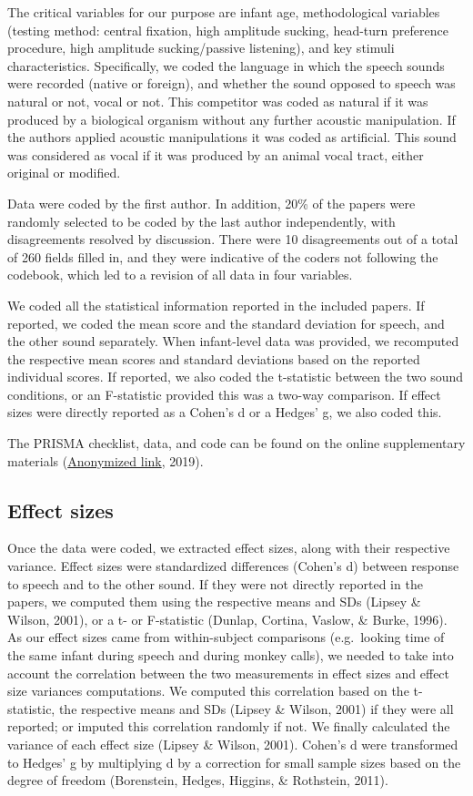\documentclass[man]{apa6}
\begin{document}
The critical variables for our purpose are infant age, methodological
variables (testing method: central fixation, high amplitude sucking,
head-turn preference procedure, high amplitude sucking/passive
listening), and key stimuli characteristics. Specifically, we coded the
language in which the speech sounds were recorded (native or foreign),
and whether the sound opposed to speech was natural or not, vocal or
not. This competitor was coded as natural if it was produced by a
biological organism without any further acoustic manipulation. If the
authors applied acoustic manipulations it was coded as artificial. This
sound was considered as vocal if it was produced by an animal vocal
tract, either original or modified.

Data were coded by the first author. In addition, 20\% of the papers
were randomly selected to be coded by the last author independently,
with disagreements resolved by discussion. There were 10 disagreements
out of a total of 260 fields filled in, and they were indicative of the
coders not following the codebook, which led to a revision of all data
in four variables.

We coded all the statistical information reported in the included
papers. If reported, we coded the mean score and the standard deviation
for speech, and the other sound separately. When infant-level data was
provided, we recomputed the respective mean scores and standard
deviations based on the reported individual scores. If reported, we also
coded the t-statistic between the two sound conditions, or an
F-statistic provided this was a two-way comparison. If effect sizes were
directly reported as a Cohen's d or a Hedges' g, we also coded this.

The PRISMA checklist, data, and code can be found on the online
supplementary materials
(\href{https://osf.io/4stz9/?view_only=d0696591ebf34bfc8430f848cd945ca8}{Anonymized
link}, 2019).

\subsection{Effect sizes}\label{effect-sizes}

Once the data were coded, we extracted effect sizes, along with their
respective variance. Effect sizes were standardized differences (Cohen's
d) between response to speech and to the other sound. If they were not
directly reported in the papers, we computed them using the respective
means and SDs (Lipsey \& Wilson, 2001), or a t- or F-statistic (Dunlap,
Cortina, Vaslow, \& Burke, 1996). As our effect sizes came from
within-subject comparisons (e.g.~looking time of the same infant during
speech and during monkey calls), we needed to take into account the
correlation between the two measurements in effect sizes and effect size
variances computations. We computed this correlation based on the
t-statistic, the respective means and SDs (Lipsey \& Wilson, 2001) if
they were all reported; or imputed this correlation randomly if not. We
finally calculated the variance of each effect size (Lipsey \& Wilson,
2001). Cohen's d were transformed to Hedges' g by multiplying d by a
correction for small sample sizes based on the degree of freedom
(Borenstein, Hedges, Higgins, \& Rothstein, 2011).
\end{document}

